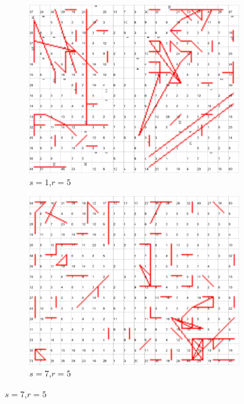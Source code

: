 \documentclass{acm_proc_article-sp}
\begin{document}
\begin{figure}
\centering
    \centering
    \begin{subfigure}[b]{0.30\linewidth}
        \includegraphics[width=\linewidth]{img/wine-newmid-radius-neighbourhood-graph--r-05-seed-1}
        \caption{$s=1$,$r=5$}
    \end{subfigure}
    \begin{subfigure}[b]{0.30\linewidth}
        \includegraphics[width=\linewidth]{img/wine-newmid-radius-neighbourhood-graph--r-05-seed-7}
        \caption{$s=7$,$r=5$}
    \end{subfigure}

\end{figure}
\end{document}

